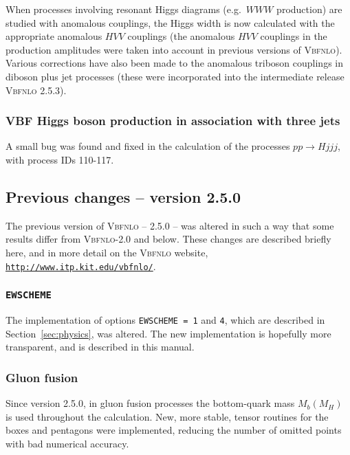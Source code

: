 \documentclass[english,12pt]{article}
\begin{document}
When processes involving resonant Higgs diagrams (e.g.\ $WWW$ production) are studied with anomalous couplings, the Higgs width is now calculated with the appropriate anomalous $HVV$ couplings (the anomalous $HVV$ couplings in the production amplitudes were taken into account in previous versions of \textsc{Vbfnlo}).  Various corrections have also been made to the anomalous triboson couplings in diboson plus jet processes (these were incorporated into the intermediate release \textsc{Vbfnlo} 2.5.3).

\subsubsection{VBF Higgs boson production in association with three jets}
A small bug was found and fixed in the calculation of the processes $pp \rightarrow H jjj$, with process IDs 110-117.


\subsection{Previous changes -- version 2.5.0}

The previous version of \textsc{Vbfnlo -- 2.5.0} -- was altered in such a
way that some results differ from \textsc{Vbfnlo-2.0} and below.  These changes are
described briefly here, and in more detail on the \textsc{Vbfnlo} website, {\tt
\href{http://www.itp.kit.edu/vbfnlo/}{http://www.itp.kit.edu/vbfnlo/}}.


\subsubsection{{\tt EWSCHEME}}

The implementation of options {\tt EWSCHEME = 1} and {\tt 4}, which are
described in Section~\ref{sec:physics}, was altered.  The new
implementation is hopefully more transparent, and is described in this manual. 

\subsubsection{Gluon fusion}

Since version 2.5.0, in gluon fusion processes the bottom-quark
mass $M_{b}(M_{H})$ is used throughout the calculation.  New, more stable,
tensor routines for the boxes and pentagons were implemented, reducing the
number of omitted points with bad numerical accuracy.


\end{document}
